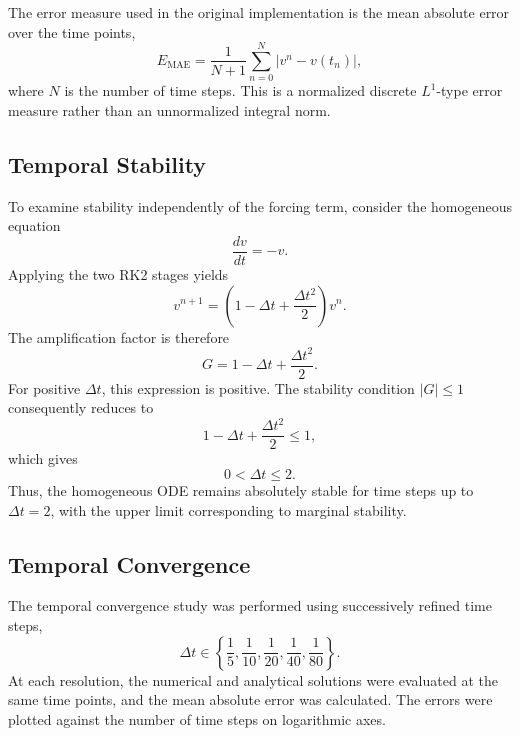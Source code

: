 The error measure used in the original implementation is the mean absolute error over the time points,
\begin{equation}
    E_{\mathrm{MAE}}=\frac{1}{N+1}
    \sum_{n=0}^{N}\left|v^n-v(t_n)\right|,
    \label{eq:app-rk2-ode-mae}
\end{equation}
where $N$ is the number of time steps. This is a normalized discrete $L^1$-type error measure rather than an unnormalized integral norm.

\subsection{Temporal Stability}
\label{app:rk2-ode-stability}

To examine stability independently of the forcing term, consider the homogeneous equation
\begin{equation}
    \frac{dv}{dt}=-v.
    \label{eq:app-rk2-ode-homogeneous}
\end{equation}
Applying the two RK2 stages yields
\begin{equation}
    v^{n+1}=\left(1-\Delta t+\frac{\Delta t^2}{2}\right)v^n.
    \label{eq:app-rk2-ode-homogeneous-update}
\end{equation}
The amplification factor is therefore
\begin{equation}
    G=1-\Delta t+\frac{\Delta t^2}{2}.
    \label{eq:app-rk2-ode-homogeneous-g}
\end{equation}
For positive $\Delta t$, this expression is positive. The stability condition $|G|\leq 1$ consequently reduces to
\begin{equation}
    1-\Delta t+\frac{\Delta t^2}{2}\leq 1,
\end{equation}
which gives
\begin{equation}
    \boxed{0<\Delta t\leq 2}.
    \label{eq:app-rk2-ode-stability-limit}
\end{equation}
Thus, the homogeneous ODE remains absolutely stable for time steps up to $\Delta t=2$, with the upper limit corresponding to marginal stability.

\subsection{Temporal Convergence}
\label{app:rk2-ode-convergence}

The temporal convergence study was performed using successively refined time steps,
\begin{equation}
    \Delta t\in\left\{
    \frac{1}{5},\frac{1}{10},\frac{1}{20},
    \frac{1}{40},\frac{1}{80}
    \right\}.
    \label{eq:app-rk2-ode-timestep-set}
\end{equation}
At each resolution, the numerical and analytical solutions were evaluated at the same time points, and the mean absolute error was calculated. The errors were plotted against the number of time steps on logarithmic axes.

